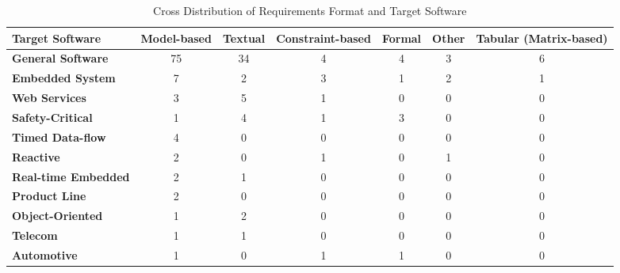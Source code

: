 \begin{table}[]
\small
\caption{Cross Distribution of Requirements Format and Target Software}
\label{tab:req_target}
\begin{tabularx}{\textwidth}{Xcccccc}
\hline
\textbf{Target Software}    & \textbf{Model-based} & \textbf{Textual} & \textbf{Constraint-based} & \textbf{Formal} & \textbf{Other} & \textbf{Tabular (Matrix-based)} \\ \hline
\textbf{General Software}   & 75             & 34               & 4                   & 4               & 3              & 6                \\
\textbf{Embedded System}    & 7              & 2                & 3                   & 1               & 2              & 1                \\
\textbf{Web Services}       & 3              & 5                & 1                   & 0               & 0              & 0                \\
\textbf{Safety-Critical}    & 1              & 4                & 1                   & 3               & 0              & 0                \\
\textbf{Timed Data-flow}    & 4              & 0                & 0                   & 0               & 0              & 0                \\
\textbf{Reactive}           & 2              & 0                & 1                   & 0               & 1              & 0                \\
\textbf{Real-time Embedded} & 2              & 1                & 0                   & 0               & 0              & 0                \\
\textbf{Product Line}       & 2              & 0                & 0                   & 0               & 0              & 0                \\
\textbf{Object-Oriented}    & 1              & 2                & 0                   & 0               & 0              & 0                \\
\textbf{Telecom}            & 1              & 1                & 0                   & 0               & 0              & 0                \\
\textbf{Automotive}         & 1              & 0                & 1                   & 1               & 0              & 0                \\ \hline
\end{tabularx}%
\end{table}